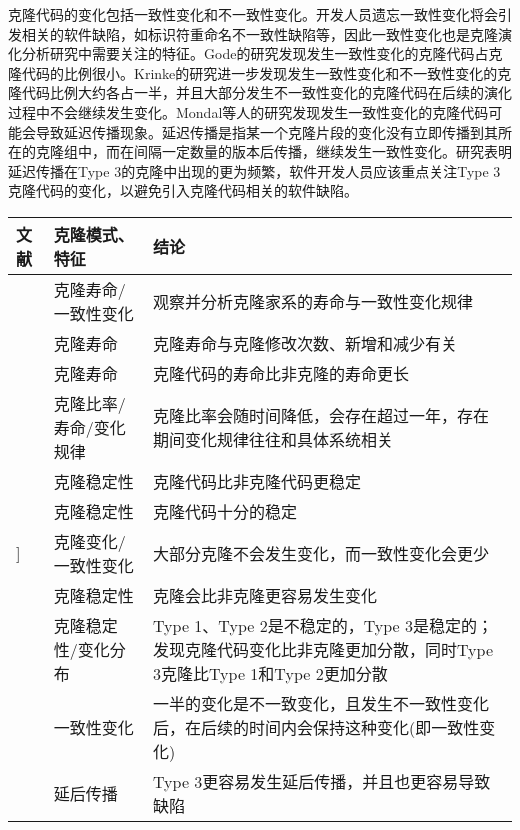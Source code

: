 克隆代码的变化包括一致性变化和不一致性变化。开发人员遗忘一致性变化将会引发相关的软件缺陷，如标识符重命名不一致性缺陷等，因此一致性变化也是克隆演化分析研究中需要关注的特征。Gode的研究发现发生一致性变化的克隆代码占克隆代码的比例很小\cite{gode2011frequency}。Krinke的研究进一步发现发生一致性变化和不一致性变化的克隆代码比例大约各占一半，并且大部分发生不一致性变化的克隆代码在后续的演化过程中不会继续发生变化\cite{Krinke2007}。Mondal等人的研究发现发生一致性变化的克隆代码可能会导致延迟传播现象。延迟传播是指某一个克隆片段的变化没有立即传播到其所在的克隆组中，而在间隔一定数量的版本后传播，继续发生一致性变化。研究表明延迟传播在Type 3的克隆中出现的更为频繁，软件开发人员应该重点关注Type 3克隆代码的变化，以避免引入克隆代码相关的软件缺陷\cite{mondal2016comparative}。

\begin{table}[htbp]
\centering
{}\vspace{0.5em}\wuhao
\begin{tabularx}{0.9\textwidth}{llX}
\toprule[1.5pt]
文献&克隆模式、特征&结论\\
\midrule[1pt]
\cite{kim2005empirical}&	克隆寿命/一致性变化	&观察并分析克隆家系的寿命与一致性变化规律\\
\cite{cai2011empirical}&	克隆寿命&	克隆寿命与克隆修改次数、新增和减少有关\\
\cite{krinke2011cloned}&	克隆寿命&	克隆代码的寿命比非克隆的寿命更长\\
\cite{bazrafshan2012evolution}\cite{gode2009evolution}&	克隆比率/寿命/变化规律	&克隆比率会随时间降低，会存在超过一年，存在期间变化规律往往和具体系统相关\\
\cite{krinke2008cloned}&克隆稳定性&	克隆代码比非克隆代码更稳定\\
\cite{gode2011clone}\cite{harder2013cloned}&	克隆稳定性&	克隆代码十分的稳定\\
\cite{gode2011frequency}]&	克隆变化/一致性变化&	大部分克隆不会发生变化，而一致性变化会更少\\
\cite{rahman2014change}&	克隆稳定性&	克隆会比非克隆更容易发生变化\\
\cite{mondal2012comparative}\cite{mondal2012dispersion}&	克隆稳定性/变化分布&	Type 1、Type 2是不稳定的，Type 3是稳定的；发现克隆代码变化比非克隆更加分散，同时Type 3克隆比Type 1和Type 2更加分散\\
\cite{Krinke2007}&	一致性变化&	一半的变化是不一致变化，且发生不一致性变化后，在后续的时间内会保持这种变化(即一致性变化)\\
\cite{mondal2016comparative}&	延后传播&	Type 3更容易发生延后传播，并且也更容易导致缺陷\\
\bottomrule[1.5pt]
\end{tabularx}
\end{table}

